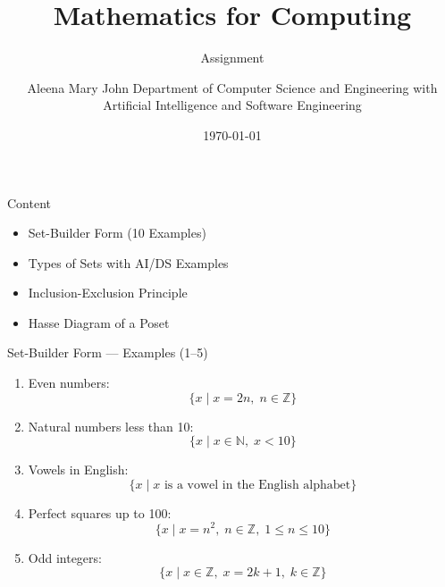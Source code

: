 \documentclass{beamer}
\title{\textbf{Mathematics for Computing}}
\subtitle{Assignment}
\author{%
Aleena Mary John 
Department of Computer Science and Engineering with Artificial Intelligence and Software Engineering \\[0.2cm]
}
\institute{
CUSAT
}
\date{\today}
\begin{document}
\begin{frame}
    \titlepage
\end{frame}

\begin{frame}{Content}
\begin{itemize}
    \item Set-Builder Form (10 Examples)
    \item Types of Sets with AI/DS Examples
    \item Inclusion-Exclusion Principle
    \item Hasse Diagram of a Poset
\end{itemize}
\end{frame}

\begin{frame}{Set-Builder Form --- Examples (1--5)}

\begin{enumerate}
    \item Even numbers:
    \[
    \{x \mid x = 2n,\; n \in \mathbb{Z}\}
    \]
    \item Natural numbers less than 10:
    \[
    \{x \mid x \in \mathbb{N},\; x < 10\}
    \]
    \item Vowels in English:
    \[
    \{x \mid x \text{ is a vowel in the English alphabet}\}
    \]
    \item Perfect squares up to 100:
    \[
    \{x \mid x = n^2,\; n \in \mathbb{Z},\; 1 \leq n \leq 10\}
    \]
    \item Odd integers:
    \[
    \{x \mid x \in \mathbb{Z},\; x = 2k+1,\; k \in \mathbb{Z}\}
    \]
\end{enumerate}

\end{frame}
\end{document}
